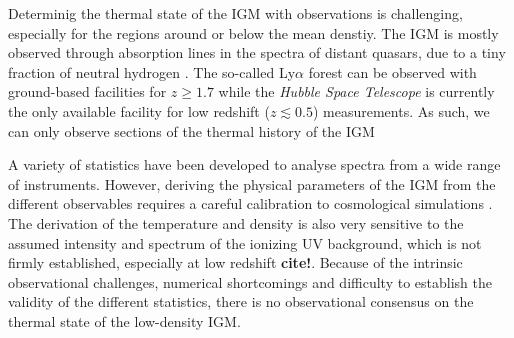\documentclass[numberedappendix]{emulateapj}
\newcommand\ALc[1]{{\color{red} \bf #1}} %
\begin{document}


Determinig the thermal state of the IGM with observations is challenging, especially for the regions around or below the mean denstiy. The IGM is mostly observed through absorption lines in the spectra of distant quasars,  due to a tiny fraction of neutral hydrogen \citep{1971ApJ...164L..73L}. The so-called Ly$\alpha$ forest can be observed with ground-based facilities for $z\geq 1.7$ while the \textit{Hubble Space Telescope} is currently the only available facility for low redshift ($z\lesssim 0.5$) measurements. As such, we can only observe sections of the  thermal history of the IGM

A variety of statistics have been developed to analyse spectra from a wide range of instruments. However, deriving the physical parameters of the IGM from the different observables requires a careful calibration to cosmological simulations \citep[see e.g.][]{1997ApJ...489....7R,2000MNRAS.318..817S,2013MNRAS.436.1023B,2017MNRAS.464..897B}. The derivation of the temperature and density is also very sensitive to the assumed intensity and spectrum  of the ionizing UV background, which is not firmly established, especially at low redshift \ALc{cite!}.
Because of the intrinsic observational challenges, numerical shortcomings and difficulty to establish the validity of the different statistics,  there is no observational consensus on the thermal state of the low-density IGM.

\end{document}
